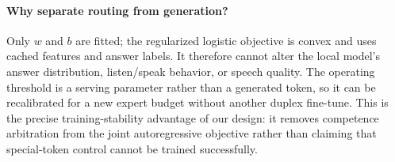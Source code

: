 \paragraph{Why separate routing from generation?}
Only $w$ and $b$ are fitted; the regularized logistic objective is convex and
uses cached features and answer labels. It therefore cannot alter the local
model's answer distribution, listen/speak behavior, or speech quality. The
operating threshold is a serving parameter rather than a generated token, so it
can be recalibrated for a new expert budget without another duplex fine-tune.
This is the precise training-stability advantage of our design: it removes
competence arbitration from the joint autoregressive objective rather than
claiming that special-token control cannot be trained successfully.
